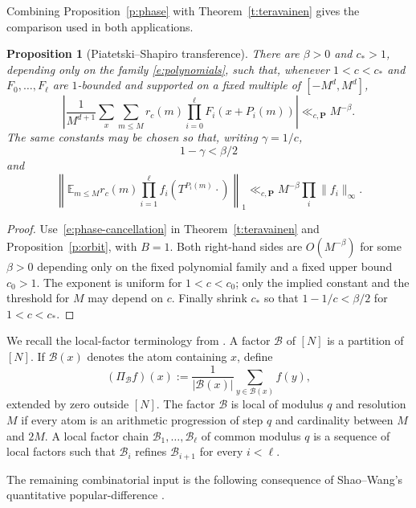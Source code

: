 \documentclass{amsart}
\newcommand{\E}{\mathbb E}
\newcommand{\1}{\mathbf 1}
\newtheorem{proposition}[theorem]{Proposition}
\begin{document}
Combining Proposition~\ref{p:phase} with  Theorem~\ref{t:teravainen} gives the comparison used in both applications.

\begin{proposition}[Piatetski--Shapiro transference]\label{p:transfer}
There are $\beta>0$ and $c_*>1$, depending only on the family
\eqref{e:polynomials}, such that, whenever $1<c<c_*$ and
$F_0,\ldots,F_\ell$ are $1$-bounded and supported on a fixed multiple
of $[-M^d,M^d]$,
\begin{equation}\label{e:discrete-transfer}
 \left|\frac1{M^{d+1}}\sum_x\sum_{m\leq M}r_c(m)
 \prod_{i=0}^{\ell}F_i(x+P_i(m))\right|
 \ll_{c,\mathbf P}M^{-\beta}.
\end{equation}
The same constants may be chosen so that, writing $\gamma=1/c$,
\begin{equation}\label{e:c-choice}
 1-\gamma<\beta/2
\end{equation}
and
\begin{equation}\label{e:ergodic-transfer}
 \left\|\E_{m\leq M}r_c(m)
 \prod_{i=1}^{\ell}f_i(T^{P_i(m)}\cdot)\right\|_1
 \ll_{c,\mathbf P}M^{-\beta}\prod_i\|f_i\|_\infty.
\end{equation}
\end{proposition}

\begin{proof}
Use~\eqref{e:phase-cancellation} in
Theorem~\ref{t:teravainen} and Proposition~\ref{p:orbit}, with $B=1$.
Both right-hand sides are $O(M^{-\beta})$ for some $\beta>0$ depending
only on the fixed polynomial family and a fixed upper bound $c_0>1$.
The exponent is uniform for $1<c<c_0$; only the implied constant and
the threshold for $M$ may depend on $c$.  Finally shrink $c_*$ so that
$1-1/c<\beta/2$ for $1<c<c_*$.
\end{proof}

We recall the local-factor terminology from
\cite[Definitions~3.1, 3.2, 3.4 and~3.6]{ShaoWang}.  A factor
$\mathcal B$ of $[N]$ is a partition of $[N]$.  If $\mathcal B(x)$
denotes the atom containing $x$, define
\[
 (\Pi_{\mathcal B}f)(x)
 :=\frac1{|\mathcal B(x)|}\sum_{y\in\mathcal B(x)}f(y),
\]
extended by zero outside $[N]$.  The factor $\mathcal B$ is local of
modulus $q$ and resolution $M$ if every atom is an arithmetic
progression of step $q$ and cardinality between $M$ and $2M$.  A local
factor chain $\mathcal B_1,\ldots,\mathcal B_\ell$ of common modulus
$q$ is a sequence of local factors such that $\mathcal B_i$ refines
$\mathcal B_{i+1}$ for every $i<\ell$. 

The remaining combinatorial input is the following consequence of
Shao--Wang's quantitative popular-difference \cite[Theorem 1.2]{ShaoWang}. 
\end{document}
